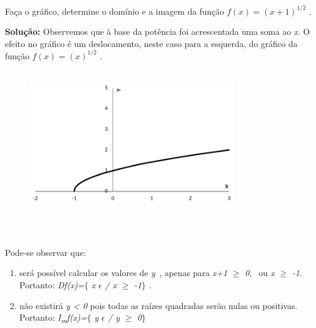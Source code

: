 \begin{texemplo}
	
Faça o gráfico, determine o domínio e a imagem da função  \( f \left( x \right) = \left( x+1 \right) ^{1/2} \) .

\textbf{Solução:} Observemos que à base da potência foi acrescentada uma soma ao \textit{x}. O efeito no gráfico é um deslocamento, neste caso para a esquerda, do gráfico da função  \( f \left( x \right) = \left( x \right) ^{1/2} \) .

\begin{figure}[H]
	\begin{Center}
		\includegraphics[width=3.49in,height=2.46in]{capitulos/outras_funcoes/media/image8.pdf}
	\end{Center}
\end{figure}

~~

Pode-se observar que: 

\begin{enumerate}
	\item será possível calcular os valores de \textit{y}~, apenas para  \textit{x+1 $ \geq $  0},~ ou \textit{x $ \geq $  -1}. Portanto: \textit{Df(x)=$ \{ $  x $ \epsilon $  \textbf{ }/ x $ \geq $  -1$ \} $ .}

	\item  não existirá \textit{y < 0} pois todas as raízes quadradas serão nulas ou positivas. Portanto: \textit{I\textsubscript{m}f(x)=$ \{ $ y $ \epsilon $   / y $ \geq $  0$ \} $  }\qedsymbol{} 
\end{enumerate}
\end{texemplo}

